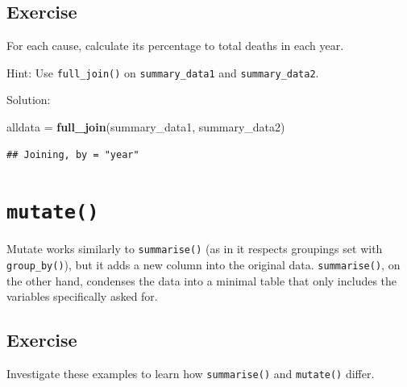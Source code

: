 \documentclass[]{book}
\makeatletter
\newenvironment{Shaded}{\begin{snugshade}}{\end{snugshade}}
\newcommand{\KeywordTok}[1]{\textcolor[rgb]{0.13,0.29,0.53}{\textbf{#1}}}
\newcommand{\DecValTok}[1]{\textcolor[rgb]{0.00,0.00,0.81}{#1}}
\newcommand{\StringTok}[1]{\textcolor[rgb]{0.31,0.60,0.02}{#1}}
\newcommand{\OperatorTok}[1]{\textcolor[rgb]{0.81,0.36,0.00}{\textbf{#1}}}
\newcommand{\NormalTok}[1]{#1}
\newenvironment{kframe}{%
\medskip{}
\setlength{\fboxsep}{.8em}
 \def\at@end@of@kframe{}%
 \ifinner\ifhmode%
  \def\at@end@of@kframe{\end{minipage}}%
  \begin{minipage}{\columnwidth}%
 \fi\fi%
 \def\FrameCommand##1{\hskip\@totalleftmargin \hskip-\fboxsep
 \colorbox{shadecolor}{##1}\hskip-\fboxsep
     \hskip-\linewidth \hskip-\@totalleftmargin \hskip\columnwidth}%
 \MakeFramed {\advance\hsize-\width
   \@totalleftmargin\z@ \linewidth\hsize
   \@setminipage}}%
 {\par\unskip\endMakeFramed%
 \at@end@of@kframe}
\renewenvironment{Shaded}{\begin{kframe}}{\end{kframe}}
\makeatother
\begin{document}
\subsection{Exercise}\label{exercise-17}

For each cause, calculate its percentage to total deaths in each year.

Hint: Use \texttt{full\_join()} on \texttt{summary\_data1} and
\texttt{summary\_data2}.

Solution:

\begin{Shaded}
\begin{Highlighting}[]
\NormalTok{alldata =}\StringTok{ }\KeywordTok{full_join}\NormalTok{(summary_data1, summary_data2)}
\end{Highlighting}
\end{Shaded}

\begin{verbatim}
## Joining, by = "year"
\end{verbatim}

\begin{Shaded}
\end{Shaded}

\section{\texorpdfstring{\texttt{mutate()}}{mutate()}}\label{mutate}

Mutate works similarly to \texttt{summarise()} (as in it respects
groupings set with \texttt{group\_by()}), but it adds a new column into
the original data. \texttt{summarise()}, on the other hand, condenses
the data into a minimal table that only includes the variables
specifically asked for.

\subsection{Exercise}\label{exercise-18}

Investigate these examples to learn how \texttt{summarise()} and
\texttt{mutate()} differ.
\end{document}
